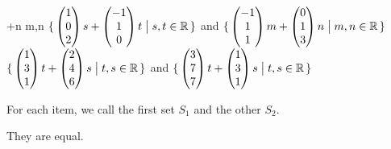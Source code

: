 \begin{exercises}
\begin{exparts}
{                        +n
                     \suchthat m,n\in\Re} \)
      \partsitem \( \mbox{$\{\,\begin{pmatrix} 1 \\ 0 \\ 2 \end{pmatrix}s
                        +\begin{pmatrix} -1 \\ 1 \\ 0 \end{pmatrix}t
                     \bigm| s,t\in\mathbb{R}\,\}$} \)
            and
            \( \mbox{$\{\,\begin{pmatrix} -1 \\ 1 \\ 1 \end{pmatrix}m
                        +\begin{pmatrix} 0 \\ 1 \\ 3 \end{pmatrix}n
                     \bigm| m,n\in\mathbb{R}\,\}$} \)
      \partsitem \( \mbox{$\{\,\begin{pmatrix} 1 \\ 3 \\ 1 \end{pmatrix}t
                        +\begin{pmatrix} 2 \\ 4 \\ 6 \end{pmatrix}s
                     \bigm| t,s\in\mathbb{R}\,\}$} \)
            and
            \( \mbox{$\{\,\begin{pmatrix} 3 \\ 7 \\ 7 \end{pmatrix}t
                        +\begin{pmatrix} 1 \\ 3 \\ 1 \end{pmatrix}s
                     \bigm| t,s\in\mathbb{R}\,\}$} \)
    \end{exparts}
    \begin{answer}
      For each item, we call the first set \( S_1 \) and the
      other \( S_2 \).
     \begin{exparts}
      \partsitem They are equal.


\end{exparts}
\end{answer}
\end{exercises}
